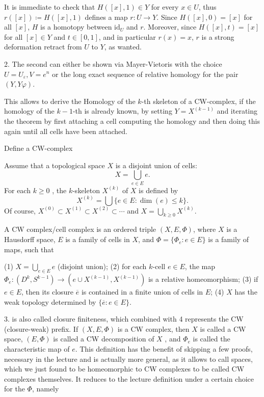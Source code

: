 It is immediate to check that \( H([x], 1) \in Y \) for every \( x \in U \), thus \( r([x]) \coloneqq H([x], 1) \) defines a map \( r: U \rightarrow Y \). 
Since \( H([x], 0) = [x] \) for all \( [x] \), \( H \) is a homotopy between \( \text{id}_U \) and \( r \). 
Moreover, since \( H([x], t) = [x] \) for all \( [x] \in Y \) and \( t \in [0, 1] \), and in particular \( r(x) = x \), \(r\) is a 
strong deformation retract from \( U \) to \( Y \), as wanted.

2. The second can either be shown via Mayer-Vietoris with the choice \( U = U_\varepsilon, V = e^n \) or the long exact sequence 
of relative homology for the pair \( (Y, Y\varphi) \).

This allows to derive the Homology of the \( k \)-th skeleton of a CW-complex, 
if the homology of the \( k-1 \)-th is already known, by setting \( Y = X^(k-1) \) and iterating the theorem by first attaching
a cell computing the homology and then doing this again until all cells have been attached.


Define a CW-complex

Assume that a topological space \( X \) is a disjoint union of cells:
\[ X = \bigcup_{e \in E} e. \] 
For each \( k \geq 0 \) , the \(k\)-skeleton \(X^{(k)}\) of \(X\) is defined by 
\[ X^{(k)} = \bigcup \{e \in E: \dim(e) \leq k\}. \]
Of course, \(X^{(0)} \subset X^{(1)} \subset X^{(2)} \subset \dotsb\) and \(X = \bigcup_{k \geq 0} X^{(k)}\).

A CW complex/cell complex is an ordered triple \( (X, E, \Phi) \), where \( X \) is a Hausdorff space, \( E \) is a family of cells in \( X \), 
and \( \Phi = \{\Phi_e : e \in E\} \) is a family of maps, such that 

(1) \( X = \bigcup_{e \in E} e \) (disjoint union); 
(2) for each \( k \)-cell \( e \in E \), the map \( \Phi_e : (D^k, S^{k-1}) \to (e \cup X^{(k-1)}, X^{(k-1)}) \) is a relative homeomorphism; 
(3) if \( e \in E \), then its closure \( \overline{e} \) is contained in a finite union of cells in \( E \); 
(4) \( X \) has the weak topology determined by \( \{\overline{e} : e \in E\} \). 

3. is also called closure finiteness, which combined with 4 represents the CW (closure-weak) prefix.
If \( (X, E, \Phi) \) is a CW complex, then \( X \) is called a CW space, \( (E, \Phi) \) is called a CW decomposition of \( X \) , 
and \( \Phi_e \) is called the characteristic map of \( e \).
This definition has the benefit of skipping a few proofs, necessary in the lecture and is actually more general,
as it allows to call spaces, which we just found to be homeomorphic to CW complexes to be called CW complexes themselves.
It reduces to the lecture definition under a certain choice for the \( \Phi \), namely


